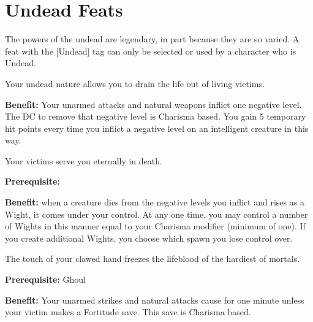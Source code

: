 \section{Undead Feats}

The powers of the undead are legendary, in part because they are so varied. A feat with the [Undead] tag can only be selected or used by a character who is Undead.


Your undead nature allows you to drain the life out of living victims.

\textbf{Benefit:} Your unarmed attacks and natural weapons inflict one negative level. The DC to remove that negative level is Charisma based. You gain 5 temporary hit points every time you inflict a negative level on an intelligent creature in this way.


Your victims serve you eternally in death.

\textbf{Prerequisite:} 

\textbf{Benefit:} when a creature dies from the negative levels you inflict and rises as a Wight, it comes under your control. At any one time, you may control a number of Wights in this manner equal to your Charisma modifier (minimum of one). If you create additional Wights, you choose which spawn you lose control over.


The touch of your clawed hand freezes the lifeblood of the hardiest of mortals.

\textbf{Prerequisite:} Ghoul

\textbf{Benefit:} Your unarmed strikes and natural attacks cause  for one minute unless your victim makes a Fortitude save. This save is Charisma based.
